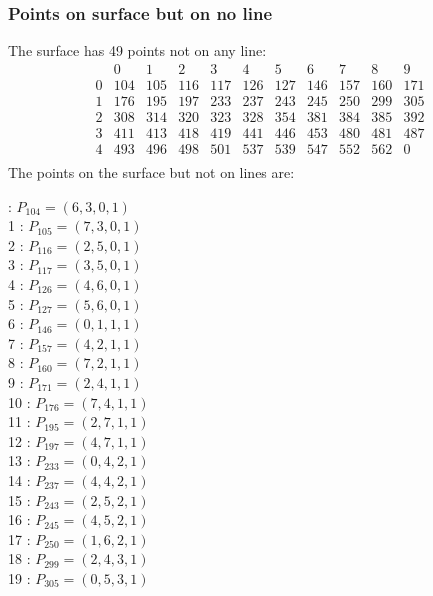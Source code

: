 \documentclass{article}
\begin{document}
{\subsubsection*{Points on surface but on no line}
The surface has 49 points not on any line:\\
$$
\begin{array}{r|*{10}{r}}
 & 0 & 1 & 2 & 3 & 4 & 5 & 6 & 7 & 8 & 9\\
\hline
0 & 104 & 105 & 116 & 117 & 126 & 127 & 146 & 157 & 160 & 171\\
1 & 176 & 195 & 197 & 233 & 237 & 243 & 245 & 250 & 299 & 305\\
2 & 308 & 314 & 320 & 323 & 328 & 354 & 381 & 384 & 385 & 392\\
3 & 411 & 413 & 418 & 419 & 441 & 446 & 453 & 480 & 481 & 487\\
4 & 493 & 496 & 498 & 501 & 537 & 539 & 547 & 552 & 562 & 0\\
\end{array}
$$
The points on the surface but not on lines are:\\
\begin{multicols}{2}
 : $P_{104}=( 6, 3, 0, 1 )$\\
1 : $P_{105}=( 7, 3, 0, 1 )$\\
2 : $P_{116}=( 2, 5, 0, 1 )$\\
3 : $P_{117}=( 3, 5, 0, 1 )$\\
4 : $P_{126}=( 4, 6, 0, 1 )$\\
5 : $P_{127}=( 5, 6, 0, 1 )$\\
6 : $P_{146}=( 0, 1, 1, 1 )$\\
7 : $P_{157}=( 4, 2, 1, 1 )$\\
8 : $P_{160}=( 7, 2, 1, 1 )$\\
9 : $P_{171}=( 2, 4, 1, 1 )$\\
10 : $P_{176}=( 7, 4, 1, 1 )$\\
11 : $P_{195}=( 2, 7, 1, 1 )$\\
12 : $P_{197}=( 4, 7, 1, 1 )$\\
13 : $P_{233}=( 0, 4, 2, 1 )$\\
14 : $P_{237}=( 4, 4, 2, 1 )$\\
15 : $P_{243}=( 2, 5, 2, 1 )$\\
16 : $P_{245}=( 4, 5, 2, 1 )$\\
17 : $P_{250}=( 1, 6, 2, 1 )$\\
18 : $P_{299}=( 2, 4, 3, 1 )$\\
19 : $P_{305}=( 0, 5, 3, 1 )$\\

\end{multicols}}
\end{document}

